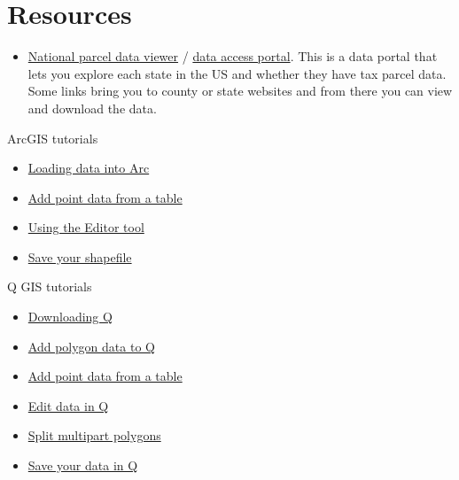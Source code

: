 \documentclass[
]{book}
\providecommand{\tightlist}{%
  \setlength{\itemsep}{0pt}\setlength{\parskip}{0pt}}
\begin{document}
\section{Resources}\label{resources-1}

\begin{itemize}
\tightlist
\item
  \href{https://www.arcgis.com/apps/mapviewer/index.html?url=https://services5.arcgis.com/fmKivMCp6fwbWbeE/ArcGIS/rest/services/2023_NSGIC_Parcel_Portal/FeatureServer&source=sd}{National parcel data viewer} / \href{https://services5.arcgis.com/fmKivMCp6fwbWbeE/ArcGIS/rest/services/2023_NSGIC_Parcel_Portal/FeatureServer}{data access portal}. This is a data portal that lets you explore each state in the US and whether they have tax parcel data. Some links bring you to county or state websites and from there you can view and download the data.
\end{itemize}

ArcGIS tutorials

\begin{itemize}
\item
  \href{https://pro.arcgis.com/en/pro-app/latest/help/data/geodatabases/overview/load-data.htm}{Loading data into Arc}
\item
  \href{https://pro.arcgis.com/en/pro-app/latest/get-started/create-points-from-a-table.htm}{Add point data from a table}
\item
  \href{https://desktop.arcgis.com/en/arcmap/latest/manage-data/editing-fundamentals/adding-the-editor-toolbar.htm}{Using the Editor tool}
\item
  \href{https://pro.arcgis.com/en/pro-app/latest/help/data/geodatabases/overview/export-data.htm}{Save your shapefile}
\end{itemize}

Q GIS tutorials

\begin{itemize}
\item
  \href{https://qgis.org/download/}{Downloading Q}
\item
  \href{https://www.youtube.com/watch?v=WbnFbgE7P4o}{Add polygon data to Q}
\item
  \href{https://qgis-tuts-wu.readthedocs.io/en/latest/land_degradation_development/interpolation/loading_table.html}{Add point data from a table}
\item
  \href{https://docs.qgis.org/3.40/en/docs/user_manual/working_with_vector/editing_geometry_attributes.html}{Edit data in Q}
\item
  \href{https://www.youtube.com/watch?v=Syas8ajiQ8w}{Split multipart polygons}
\item
  \href{https://www.youtube.com/watch?v=bf1w1AeaHsw}{Save your data in Q}
\end{itemize}
\end{document}
